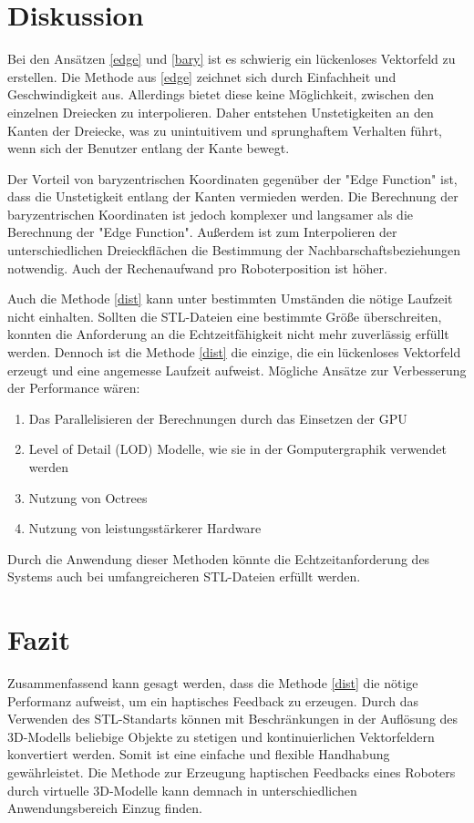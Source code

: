 \documentclass[conference]{IEEEtran}
\begin{document}
\section{Diskussion}
Bei den Ansätzen \ref*{edge} und \ref*{bary} ist es schwierig ein lückenloses Vektorfeld zu erstellen. 
Die Methode aus \ref*{edge} zeichnet sich durch Einfachheit und Geschwindigkeit aus. Allerdings bietet  diese keine Möglichkeit, zwischen den einzelnen Dreiecken zu interpolieren. Daher entstehen Unstetigkeiten an den Kanten der Dreiecke, was zu unintuitivem und sprunghaftem Verhalten führt, wenn sich der Benutzer entlang der Kante bewegt.

Der Vorteil von baryzentrischen Koordinaten gegenüber der "Edge Function" ist, dass die Unstetigkeit entlang der Kanten vermieden werden. Die Berechnung der baryzentrischen Koordinaten ist jedoch komplexer und langsamer als die Berechnung der "Edge Function". Außerdem ist zum Interpolieren der unterschiedlichen Dreieckflächen die Bestimmung der Nachbarschaftsbeziehungen notwendig. Auch der Rechenaufwand pro Roboterposition ist höher.

Auch die Methode \ref*{dist} kann unter bestimmten Umständen die nötige Laufzeit nicht einhalten. Sollten die STL-Dateien eine bestimmte Größe überschreiten, konnten die Anforderung an die Echtzeitfähigkeit nicht mehr zuverlässig erfüllt werden. Dennoch ist die Methode \ref*{dist} die einzige, die ein lückenloses Vektorfeld erzeugt und eine angemesse Laufzeit aufweist. Mögliche Ansätze zur Verbesserung der Performance wären: 
\begin{enumerate}
    \item Das Parallelisieren der Berechnungen durch das Einsetzen der GPU
    \item Level of Detail (LOD) Modelle, wie sie in der Gomputergraphik verwendet werden
    \item Nutzung von Octrees
    \item Nutzung von leistungsstärkerer Hardware
\end{enumerate}
Durch die Anwendung dieser Methoden könnte die Echtzeitanforderung des Systems auch bei umfangreicheren STL-Dateien erfüllt werden.

\section{Fazit}

Zusammenfassend kann gesagt werden, dass die Methode \ref*{dist} die nötige Performanz aufweist, um ein haptisches Feedback zu erzeugen. Durch das Verwenden des STL-Standarts können mit Beschränkungen in der Auflösung des 3D-Modells beliebige Objekte zu stetigen und kontinuierlichen Vektorfeldern konvertiert werden. Somit ist eine einfache und flexible Handhabung gewährleistet. Die Methode zur Erzeugung haptischen Feedbacks eines Roboters durch virtuelle 3D-Modelle kann demnach in unterschiedlichen Anwendungsbereich Einzug finden.  

\printbibliography
\end{document}
